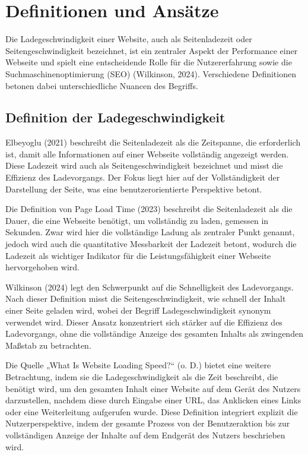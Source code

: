 \section{Definitionen und Ansätze}
\label{sec:definitionen_und_ansatze}
Die Ladegeschwindigkeit einer Website, auch als Seitenladezeit oder Seitengeschwindigkeit bezeichnet, ist ein zentraler Aspekt der Performance einer Webseite und spielt eine entscheidende Rolle für die Nutzererfahrung sowie die Suchmaschinenoptimierung (SEO) (Wilkinson, 2024). Verschiedene Definitionen betonen dabei unterschiedliche Nuancen des Begriffs.

\subsection{Definition der Ladegeschwindigkeit}
\label{sec:definition_der_ladegeschwindigkeit}
Elbeyoglu (2021) beschreibt die Seitenladezeit als die Zeitspanne, die erforderlich ist, damit alle Informationen auf einer Webseite vollständig angezeigt werden. Diese Ladezeit wird auch als Seitengeschwindigkeit bezeichnet und misst die Effizienz des Ladevorgangs. Der Fokus liegt hier auf der Vollständigkeit der Darstellung der Seite, was eine benutzerorientierte Perspektive betont.

Die Definition von Page Load Time (2023) beschreibt die Seitenladezeit als die Dauer, die eine Webseite benötigt, um vollständig zu laden, gemessen in Sekunden. Zwar wird hier die vollständige Ladung als zentraler Punkt genannt, jedoch wird auch die quantitative Messbarkeit der Ladezeit betont, wodurch die Ladezeit als wichtiger Indikator für die Leistungsfähigkeit einer Webseite hervorgehoben wird.

Wilkinson (2024) legt den Schwerpunkt auf die Schnelligkeit des Ladevorgangs. Nach dieser Definition misst die Seitengeschwindigkeit, wie schnell der Inhalt einer Seite geladen wird, wobei der Begriff Ladegeschwindigkeit synonym verwendet wird. Dieser Ansatz konzentriert sich stärker auf die Effizienz des Ladevorgangs, ohne die vollständige Anzeige des gesamten Inhalts als zwingenden Maßstab zu betrachten.

Die Quelle „What Is Website Loading Speed?“ (o. D.) bietet eine weitere Betrachtung, indem sie die Ladegeschwindigkeit als die Zeit beschreibt, die benötigt wird, um den gesamten Inhalt einer Website auf dem Gerät des Nutzers darzustellen, nachdem diese durch Eingabe einer URL, das Anklicken eines Links oder eine Weiterleitung aufgerufen wurde. Diese Definition integriert explizit die Nutzerperspektive, indem der gesamte Prozess von der Benutzeraktion bis zur vollständigen Anzeige der Inhalte auf dem Endgerät des Nutzers beschrieben wird.

